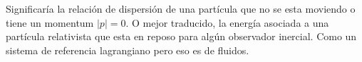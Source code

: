 \documentclass[../main_ej.tex]{subfiles}
\begin{document}
Significaría la relación de dispersión de una partícula que no se esta moviendo o tiene un momentum $|p|=0$. O mejor traducido, la energía asociada a una partícula relativista que esta en reposo para algún observador inercial. Como un sistema de referencia lagrangiano pero eso es de fluidos. 



 
\end{document}
